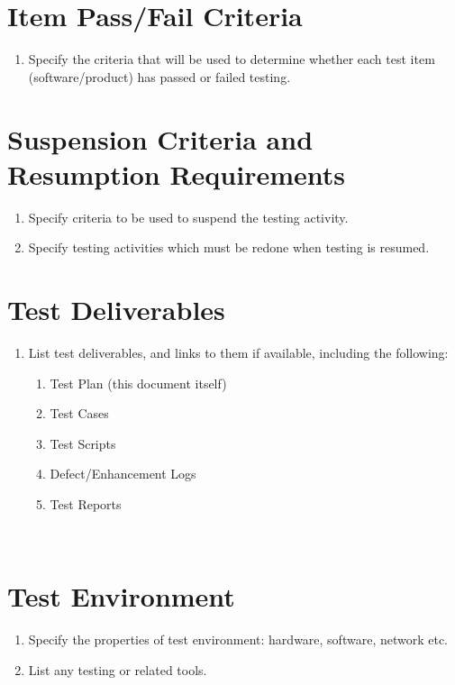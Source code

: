 \section{Item Pass/Fail Criteria}

\begin{enumerate}
	\item Specify the criteria that will be used to determine whether each test item (software/product) has passed or failed testing.
\end{enumerate}

\section{Suspension Criteria and Resumption Requirements}

\begin{enumerate}
	\item Specify criteria to be used to suspend the testing activity.
	\item Specify testing activities which must be redone when testing is resumed.
\end{enumerate}

\section{Test Deliverables}

\begin{enumerate}
	\item List test deliverables, and links to them if available, including the following:

\begin{enumerate}
	\item Test Plan (this document itself)
	\item Test Cases
	\item Test Scripts
	\item Defect/Enhancement Logs
	\item Test Reports
\end{enumerate}
\end{enumerate}
~
\section{Test Environment}

\begin{enumerate}
	\item Specify the properties of test environment: hardware, software, network etc.
	\item List any testing or related tools.
\end{enumerate}

